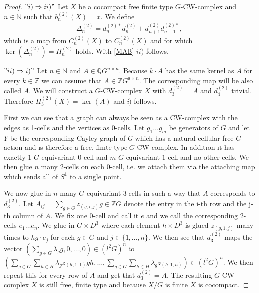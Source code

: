 \documentclass[12pt,a4paper]{scrartcl}
\numberwithin{equation}{section}
\newcommand{\Q}{\mathbb{Q}} %
\newcommand{\Z}{\mathbb{Z}} %
\newcommand{\N}{\mathbb{N}} %
\newcommand{\2}{\mathbb{Z} / 2 \mathbb{Z}}
\newcommand{\1}{\bar{1}}
\newcommand{\0}{\bar{0}}
\begin{document}
\begin{proof}
	$"i) \Rightarrow ii)"$ Let $X$ be a cocompact free finite type $G$-CW-complex and $n \in \N$ such that $b_n^{(2)}(X)=x$. We define 
	\begin{align*}
		\Delta_n^{(2)} = d_n^{(2)*} d_n^{(2)} + d_{n+1}^{(2)} d_{n+1}^{(2)*},
	\end{align*}
	which is a map from $C_n^{(2)}(X)$ to $C_n^{(2)}(X)$ and for which $\ker(\Delta_n^{(2)}) = H_n^{(2)}$ holds. With \ref{MAB} $ii)$ follows. 
	
	$"ii) \Rightarrow i)"$ Let $n \in \N$ and $A\in \Q G^{n \times n}$. Because $k \cdot A$ has the same kernel as $A$ for every $k \in \Z$ we can assume that $A \in \Z G^{n \times n}$. The corresponding map will be also called $A$. We will construct a $G$-CW-complex $X$ with $d_3^{(2)} = A$ and $d_4^{(2)}$ trivial. Therefore $H_3^{(2)}(X) = \ker(A)$ and $i)$ follows.
	
	First we can see that a graph can always be seen as a CW-complex with the edges as 1-cells and the vertices as 0-cells. Let $g_1 \ldots g_m$ be generators of $G$ and let $Y$ be the corresponding Cayley graph of $G$ which has a natural cellular free $G$-action and is therefore a free, finite type $G$-CW-complex. In addition it has exactly $1$ $G$-equivariant $0$-cell and $m$ $G$-equivariant $1$-cell and no other cells. We then glue $n$ many $2$-cells on each $0$-cell, i.e. we attach them via the attaching map which sends all of $S^1$ to a single point. 
	
	We now glue in $n$ many $G$-equivariant $3$-cells in such a way that $A$ corresponds to $d_3^{(2)}$. Let $A_{ij} = \sum_{g \in G} z_{(g, i, j)} g \in \Z G$ denote the entry in the i-th row and the j-th column of $A$. We fix one $0$-cell and call it $e$ and we call the corresponding $2$-cells $e_1 \ldots e_n$. We glue in $G \times D^3$ where each element $h \times D^3$ is glued $z_{(g, 1, j)}$ many times to $h g \cdot e_j$ for each $g \in G$ and $j \in \{1, \ldots, n\}$. We then see that $d_3^{(2)}$ maps the vector $(\sum_{g \in G} \lambda_g g, 0 , \ldots , 0) \in (l^2 G)^n$ to $(\sum_{g \in G} \sum_{h \in H} \lambda_g z_{(h, 1, 1)} g h, \ldots , \sum_{g \in G} \sum_{h \in H} \lambda_g z_{(h, 1, n)}) \in (l^2 G)^n$. We then repeat this for every row of $A$ and get that $d_3^{(2)} = A$. The resulting $G$-CW-complex $X$ is still free, finite type and because $X/G$ is finite $X$ is cocompact.
\end{proof}
\end{document}
